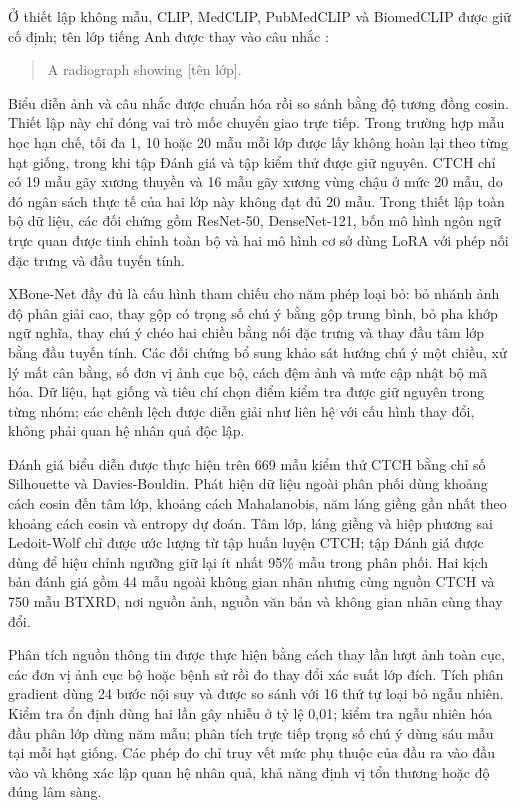 Ở thiết lập không mẫu, CLIP, MedCLIP, PubMedCLIP và BiomedCLIP được giữ cố định; tên lớp tiếng Anh được thay vào câu nhắc \cite{CLIP}:
\begin{quote}
\small\raggedright\ttfamily
A radiograph showing [tên lớp].
\end{quote}
Biểu diễn ảnh và câu nhắc được chuẩn hóa rồi so sánh bằng độ tương đồng cosin. Thiết lập này chỉ đóng vai trò mốc chuyển giao trực tiếp. Trong trường hợp mẫu học hạn chế, tối đa 1, 10 hoặc 20 mẫu mỗi lớp được lấy không hoàn lại theo từng hạt giống, trong khi tập Đánh giá và tập kiểm thử được giữ nguyên. CTCH chỉ có 19 mẫu gãy xương thuyền và 16 mẫu gãy xương vùng chậu ở mức 20 mẫu, do đó ngân sách thực tế của hai lớp này không đạt đủ 20 mẫu. Trong thiết lập toàn bộ dữ liệu, các đối chứng gồm ResNet-50, DenseNet-121, bốn mô hình ngôn ngữ trực quan được tinh chỉnh toàn bộ và hai mô hình cơ sở dùng LoRA với phép nối đặc trưng và đầu tuyến tính.

XBone-Net đầy đủ là cấu hình tham chiếu cho năm phép loại bỏ: bỏ nhánh ảnh độ phân giải cao, thay gộp có trọng số chú ý bằng gộp trung bình, bỏ pha khớp ngữ nghĩa, thay chú ý chéo hai chiều bằng nối đặc trưng và thay đầu tâm lớp bằng đầu tuyến tính. Các đối chứng bổ sung khảo sát hướng chú ý một chiều, xử lý mất cân bằng, số đơn vị ảnh cục bộ, cách đệm ảnh và mức cập nhật bộ mã hóa. Dữ liệu, hạt giống và tiêu chí chọn điểm kiểm tra được giữ nguyên trong từng nhóm; các chênh lệch được diễn giải như liên hệ với cấu hình thay đổi, không phải quan hệ nhân quả độc lập.

Đánh giá biểu diễn được thực hiện trên 669 mẫu kiểm thử CTCH bằng chỉ số Silhouette và Davies-Bouldin. Phát hiện dữ liệu ngoài phân phối dùng khoảng cách cosin đến tâm lớp, khoảng cách Mahalanobis, năm láng giềng gần nhất theo khoảng cách cosin và entropy dự đoán. Tâm lớp, láng giềng và hiệp phương sai Ledoit-Wolf chỉ được ước lượng từ tập huấn luyện CTCH; tập Đánh giá được dùng để hiệu chỉnh ngưỡng giữ lại ít nhất 95\% mẫu trong phân phối. Hai kịch bản đánh giá gồm 44 mẫu ngoài không gian nhãn nhưng cùng nguồn CTCH và 750 mẫu BTXRD, nơi nguồn ảnh, nguồn văn bản và không gian nhãn cùng thay đổi.

Phân tích nguồn thông tin được thực hiện bằng cách thay lần lượt ảnh toàn cục, các đơn vị ảnh cục bộ hoặc bệnh sử rồi đo thay đổi xác suất lớp đích. Tích phân gradient dùng 24 bước nội suy và được so sánh với 16 thứ tự loại bỏ ngẫu nhiên. Kiểm tra ổn định dùng hai lần gây nhiễu ở tỷ lệ 0,01; kiểm tra ngẫu nhiên hóa đầu phân lớp dùng năm mẫu; phân tích trực tiếp trọng số chú ý dùng sáu mẫu tại mỗi hạt giống. Các phép đo chỉ truy vết mức phụ thuộc của đầu ra vào đầu vào và không xác lập quan hệ nhân quả, khả năng định vị tổn thương hoặc độ đúng lâm sàng.


